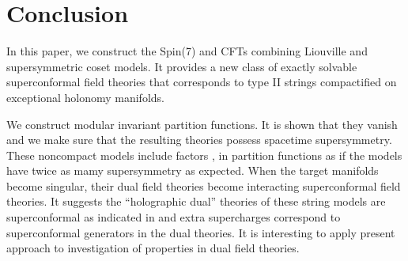 \documentclass[a4paper,12pt]{article}
\numberwithin{equation}{section}
\providecommand{\Ncal}{{\cal N}}
\providecommand{\Spin}[1]{{\rm Spin}(#1)}
\begin{document}
\section{Conclusion}\label{conclusion}
In this paper, we construct the \Spin 7 and \coordHE{} CFTs combining
 \myHighlight{$\Ncal=1$}\coordHE{} Liouville and supersymmetric coset models. 
It provides a new class of exactly solvable superconformal field
theories that corresponds to type II strings compactified on 
exceptional holonomy manifolds. 

We construct 
modular invariant
partition functions. 
It is shown that they vanish and 
we make sure that the resulting theories 
possess spacetime supersymmetry.
These noncompact models include 
factors \coordHE{}, \coordHE{} 
in partition functions as if 
the models have twice as mamy supersymmetry as expected.
When the target manifolds become singular, 
their dual field theories become interacting superconformal 
field theories.
It suggests the ``holographic dual'' theories
of these string models
are superconformal as indicated in \cite{Yamaguchi:2001kq} 
and extra supercharges correspond to superconformal \coordHE{} 
generators in the dual theories.
It is interesting to apply present approach to investigation of 
properties in dual field theories. 
\end{document}

